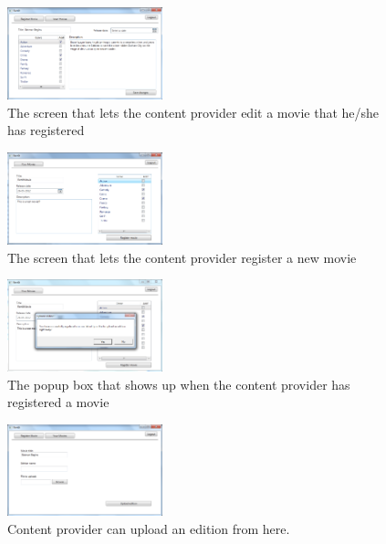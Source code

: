\begin{figure}[h!]
  \centering
    \includegraphics[width=0.4\textwidth]{Parts/Appendix/Images/CPEditmovie}
  \caption{The screen that lets the content provider edit a movie that he/she has registered}
  \label{fig:Appendix_GUI_PrototypeCPEditmovie}
\end{figure}
\begin{figure}[h!]
  \centering
    \includegraphics[width=0.4\textwidth]{Parts/Appendix/Images/CPRegistermovie}
  \caption{The screen that lets the content provider register a new movie}
  \label{fig:Appendix_GUI_PrototypeCPRegister}
\end{figure}
\begin{figure}[h!]
  \centering
    \includegraphics[width=0.4\textwidth]{Parts/Appendix/Images/CPRegisterPopup}
  \caption{The popup box that shows up when the content provider has registered a movie}
  \label{fig:Appendix_GUI_PrototypeCPRegisterpopup}
\end{figure}
\begin{figure}[h!]
  \centering
    \includegraphics[width=0.4\textwidth]{Parts/Appendix/Images/CPUploadEdition}
  \caption{Content provider can upload an edition from here.}
  \label{fig:Appendix_GUI_PrototypeCPUpload}
\end{figure}